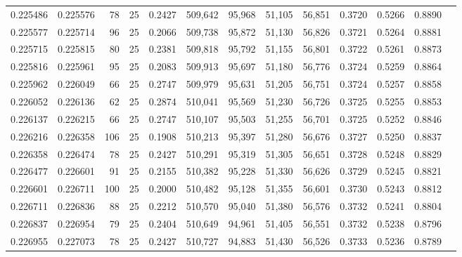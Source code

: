 \begin{tabular}{rrrrrrrrrrrrr}
0.225486 & 0.225576 &    78 &  25 &                                     0.2427 & 509,642 &  95,968 &  51,105 &  56,851 & 0.3720 & 0.5266 & 0.8890 \\
0.225577 & 0.225714 &    96 &  25 &                                     0.2066 & 509,738 &  95,872 &  51,130 &  56,826 & 0.3721 & 0.5264 & 0.8881 \\
0.225715 & 0.225815 &    80 &  25 &                                     0.2381 & 509,818 &  95,792 &  51,155 &  56,801 & 0.3722 & 0.5261 & 0.8873 \\
0.225816 & 0.225961 &    95 &  25 &                                     0.2083 & 509,913 &  95,697 &  51,180 &  56,776 & 0.3724 & 0.5259 & 0.8864 \\
0.225962 & 0.226049 &    66 &  25 &                                     0.2747 & 509,979 &  95,631 &  51,205 &  56,751 & 0.3724 & 0.5257 & 0.8858 \\
0.226052 & 0.226136 &    62 &  25 &                                     0.2874 & 510,041 &  95,569 &  51,230 &  56,726 & 0.3725 & 0.5255 & 0.8853 \\
0.226137 & 0.226215 &    66 &  25 &                                     0.2747 & 510,107 &  95,503 &  51,255 &  56,701 & 0.3725 & 0.5252 & 0.8846 \\
0.226216 & 0.226358 &   106 &  25 &                                     0.1908 & 510,213 &  95,397 &  51,280 &  56,676 & 0.3727 & 0.5250 & 0.8837 \\
0.226358 & 0.226474 &    78 &  25 &                                     0.2427 & 510,291 &  95,319 &  51,305 &  56,651 & 0.3728 & 0.5248 & 0.8829 \\
0.226477 & 0.226601 &    91 &  25 &                                     0.2155 & 510,382 &  95,228 &  51,330 &  56,626 & 0.3729 & 0.5245 & 0.8821 \\
0.226601 & 0.226711 &   100 &  25 &                                     0.2000 & 510,482 &  95,128 &  51,355 &  56,601 & 0.3730 & 0.5243 & 0.8812 \\
0.226711 & 0.226836 &    88 &  25 &                                     0.2212 & 510,570 &  95,040 &  51,380 &  56,576 & 0.3732 & 0.5241 & 0.8804 \\
0.226837 & 0.226954 &    79 &  25 &                                     0.2404 & 510,649 &  94,961 &  51,405 &  56,551 & 0.3732 & 0.5238 & 0.8796 \\
0.226955 & 0.227073 &    78 &  25 &                                     0.2427 & 510,727 &  94,883 &  51,430 &  56,526 & 0.3733 & 0.5236 & 0.8789 \\

\end{tabular}
